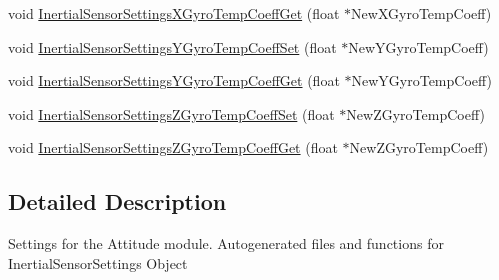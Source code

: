\begin{DoxyCompactItemize}
void \hyperlink{group___inertial_sensor_settings_ga3edaf44df4e84b2b7dda933ec441f78e}{\-Inertial\-Sensor\-Settings\-X\-Gyro\-Temp\-Coeff\-Get} (float $\ast$\-New\-X\-Gyro\-Temp\-Coeff)
\item 
void \hyperlink{group___inertial_sensor_settings_ga8d4fdb8af8ea5e49fe85d6ae9391a6a4}{\-Inertial\-Sensor\-Settings\-Y\-Gyro\-Temp\-Coeff\-Set} (float $\ast$\-New\-Y\-Gyro\-Temp\-Coeff)
\item 
void \hyperlink{group___inertial_sensor_settings_ga35f7da7b375119f30b1fe5f9551c18e3}{\-Inertial\-Sensor\-Settings\-Y\-Gyro\-Temp\-Coeff\-Get} (float $\ast$\-New\-Y\-Gyro\-Temp\-Coeff)
\item 
void \hyperlink{group___inertial_sensor_settings_ga3c2e8e69d8ee5eaafb8b392dd51eb7f2}{\-Inertial\-Sensor\-Settings\-Z\-Gyro\-Temp\-Coeff\-Set} (float $\ast$\-New\-Z\-Gyro\-Temp\-Coeff)
\item 
void \hyperlink{group___inertial_sensor_settings_ga1c685e920758b3145720ad9f5b85c738}{\-Inertial\-Sensor\-Settings\-Z\-Gyro\-Temp\-Coeff\-Get} (float $\ast$\-New\-Z\-Gyro\-Temp\-Coeff)
\end{DoxyCompactItemize}


\subsection{\-Detailed \-Description}
\-Settings for the \-Attitude module. \-Autogenerated files and functions for \-Inertial\-Sensor\-Settings \-Object 

